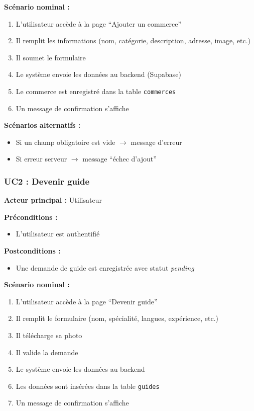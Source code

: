 \documentclass[12pt,a4paper]{report}
\begin{document}
\textbf{Scénario nominal :}
\begin{enumerate}
    \item L’utilisateur accède à la page ``Ajouter un commerce''
    \item Il remplit les informations (nom, catégorie, description, adresse, image, etc.)
    \item Il soumet le formulaire
    \item Le système envoie les données au backend (Supabase)
    \item Le commerce est enregistré dans la table \texttt{commerces}
    \item Un message de confirmation s’affiche
\end{enumerate}

\textbf{Scénarios alternatifs :}
\begin{itemize}
    \item Si un champ obligatoire est vide $\rightarrow$ message d’erreur
    \item Si erreur serveur $\rightarrow$ message ``échec d’ajout''
\end{itemize}

\vspace{0.5cm}

\subsubsection{UC2 : Devenir guide}

\textbf{Acteur principal :} Utilisateur

\textbf{Préconditions :}
\begin{itemize}
    \item L’utilisateur est authentifié
\end{itemize}

\textbf{Postconditions :}
\begin{itemize}
    \item Une demande de guide est enregistrée avec statut \textit{pending}
\end{itemize}

\textbf{Scénario nominal :}
\begin{enumerate}
    \item L’utilisateur accède à la page ``Devenir guide''
    \item Il remplit le formulaire (nom, spécialité, langues, expérience, etc.)
    \item Il télécharge sa photo
    \item Il valide la demande
    \item Le système envoie les données au backend
    \item Les données sont insérées dans la table \texttt{guides}
    \item Un message de confirmation s’affiche
\end{enumerate}
\end{document}
